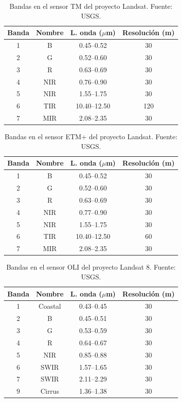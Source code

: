 \begin{table}
	\centering
	\caption[Bandas en el sensor TM]{Bandas en el sensor TM del proyecto Landsat. Fuente: USGS.}
	\begin{tabular}{@{}cccc@{}}
		\toprule[0.4mm]
		Banda & Nombre & L. onda ($\mu$m) & Resolución (m)\\
		\midrule
		1 & B & 0.45--0.52 & 30 \\
		2 & G & 0.52--0.60 & 30 \\
		3 & R & 0.63--0.69 & 30 \\
		4 & NIR & 0.76--0.90 & 30 \\
		5 & NIR & 1.55--1.75 & 30 \\
		6 & TIR & 10.40--12.50 & 120 \\
		7 & MIR & 2.08--2.35 & 30 \\
		\bottomrule[0.4mm]
	\end{tabular}
	\label{tab:sensoresTM}
\end{table}

\begin{table}
	\centering
	\caption[Bandas en el sensor ETM+]{Bandas en el sensor ETM+ del proyecto Landsat. Fuente: USGS.}
	\begin{tabular}{@{}cccc@{}}
		\toprule[0.4mm]
		Banda & Nombre & L. onda ($\mu$m) & Resolución (m)\\
		\midrule
		1 & B & 0.45--0.52 & 30 \\
		2 & G & 0.52--0.60 & 30 \\
		3 & R & 0.63--0.69 & 30 \\
		4 & NIR & 0.77--0.90 & 30 \\
		5 & NIR & 1.55--1.75 & 30 \\
		6 & TIR & 10.40--12.50 & 60 \\
		7 & MIR & 2.08--2.35 & 30 \\
		\bottomrule[0.4mm]
	\end{tabular}
	\label{tab:sensoresETM}
\end{table}

\begin{table}
	\centering
	\caption[Bandas en el sensor OLI]{Bandas en el sensor OLI del proyecto Landsat 8. Fuente: USGS.}
	\begin{tabular}{@{}cccc@{}}
		\toprule[0.4mm]
		Banda & Nombre & L. onda ($\mu$m) & Resolución (m)\\
		\midrule
		1 & Coastal & 0.43--0.45 & 30 \\
		2 & B & 0.45--0.51 & 30 \\
		3 & G & 0.53--0.59 & 30 \\
		4 & R & 0.64--0.67 & 30 \\
		5 & NIR & 0.85--0.88 & 30 \\
		6 & SWIR & 1.57--1.65 & 30 \\
		7 & SWIR & 2.11--2.29 & 30 \\
		9 & Cirrus & 1.36--1.38 & 30 \\
		\bottomrule[0.4mm]
	\end{tabular}
	\label{tab:sensoresOLI}
\end{table}

